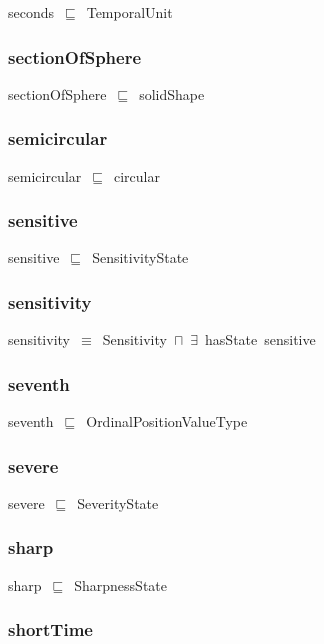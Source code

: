 \documentclass{article}
\begin{document}
seconds~\ensuremath{\sqsubseteq}~TemporalUnit~

\subsubsection*{sectionOfSphere}

sectionOfSphere~\ensuremath{\sqsubseteq}~solidShape~

\subsubsection*{semicircular}

semicircular~\ensuremath{\sqsubseteq}~circular~

\subsubsection*{sensitive}

sensitive~\ensuremath{\sqsubseteq}~SensitivityState~

\subsubsection*{sensitivity}

sensitivity~\ensuremath{\equiv}~Sensitivity~\ensuremath{\sqcap}~\ensuremath{\exists}~hasState~sensitive

\subsubsection*{seventh}

seventh~\ensuremath{\sqsubseteq}~OrdinalPositionValueType~

\subsubsection*{severe}

severe~\ensuremath{\sqsubseteq}~SeverityState~

\subsubsection*{sharp}

sharp~\ensuremath{\sqsubseteq}~SharpnessState~

\subsubsection*{shortTime}
\end{document}
